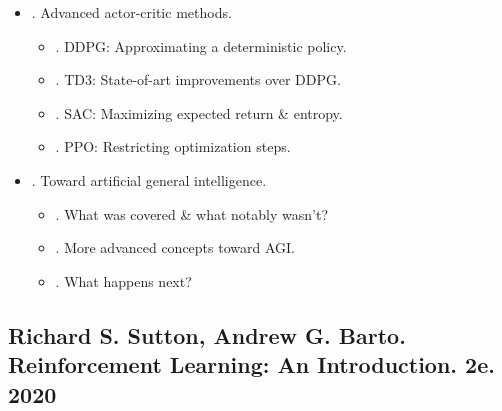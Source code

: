\documentclass{article}
\begin{document}
\begin{itemize}
    \item {. Advanced actor-critic methods.}
    \begin{itemize}
        \item {. DDPG: Approximating a deterministic policy.}
        \item {. TD3: State-of-art improvements over DDPG.}
        \item {. SAC: Maximizing expected return \& entropy.}
        \item {. PPO: Restricting optimization steps.}
    \end{itemize}
    \item {. Toward artificial general intelligence.}
    \begin{itemize}
        \item {. What was covered \& what notably wasn't?}
        \item {. More advanced concepts toward AGI.}
        \item {. What happens next?}
    \end{itemize}
\end{itemize}


\subsection{{\sc Richard S. Sutton, Andrew G. Barto}. Reinforcement Learning: An Introduction. 2e. 2020}
\end{document}
